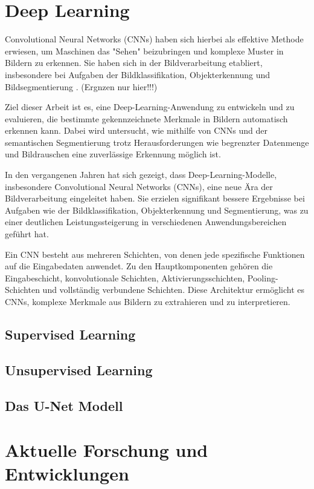\section{Deep Learning}

Convolutional Neural Networks (CNNs) haben sich hierbei als effektive Methode erwiesen, um Maschinen das "Sehen" beizubringen und komplexe Muster in Bildern zu erkennen. Sie haben sich in der Bildverarbeitung etabliert, insbesondere bei Aufgaben der Bildklassifikation, Objekterkennung und Bildsegmentierung \cite{qi_review_2020}. (Ergnzen nur hier!!!)

Ziel dieser Arbeit ist es, eine Deep-Learning-Anwendung zu entwickeln und zu evaluieren, die bestimmte gekennzeichnete Merkmale in Bildern automatisch erkennen kann. Dabei wird untersucht, wie mithilfe von CNNs und der semantischen Segmentierung trotz Herausforderungen wie begrenzter Datenmenge und Bildrauschen eine zuverlässige Erkennung möglich ist.

 In den vergangenen Jahren hat sich gezeigt, dass Deep-Learning-Modelle, insbesondere Convolutional Neural Networks (CNNs), eine neue Ära der Bildverarbeitung eingeleitet haben. Sie erzielen signifikant bessere Ergebnisse bei Aufgaben wie der Bildklassifikation, Objekterkennung und Segmentierung, was zu einer deutlichen Leistungssteigerung in verschiedenen Anwendungsbereichen geführt hat.\cite{minaee_image_2022}

Ein CNN besteht aus mehreren Schichten, von denen jede spezifische Funktionen auf die Eingabedaten anwendet. Zu den Hauptkomponenten gehören die Eingabeschicht, konvolutionale Schichten, Aktivierungsschichten, Pooling-Schichten und vollständig verbundene Schichten. Diese Architektur ermöglicht es CNNs, komplexe Merkmale aus Bildern zu extrahieren und zu interpretieren.\cite{jogin_feature_2018}

\subsection{Supervised Learning}
\subsection{Unsupervised Learning}
\subsection{Das U-Net Modell}
\section{Aktuelle Forschung und Entwicklungen}
